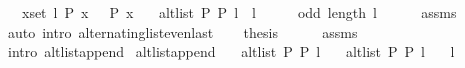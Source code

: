 \begin{isabellebody}
\ \ \ {\isachardoublequoteopen}{\isasymforall}x{\isasymin}set\ l{}{\isachardot}{\kern0pt}\ P{}\ x\ {\isasymlongleftrightarrow}\ {\isasymnot}\ P{}\ x{\isachardoublequoteclose}\isanewline
\ \ \ {\isachardoublequoteopen}alt{\isacharunderscore}{\kern0pt}list\ P{}\ P{}\ {\isacharparenleft}{\kern0pt}l{}\ {\isacharat}{\kern0pt}\ l{}{\isacharparenright}{\kern0pt}{\isachardoublequoteclose}%
\endisataginvisible
{\isafoldinvisible}%
%
\isadeliminvisible
%
\endisadeliminvisible
\isanewline
%
\isadelimproof
%
\endisadelimproof
%
\isatagproof
{}\isamarkupfalse%
\ {\isacharminus}{\kern0pt}\isanewline
\ \ \isamarkupfalse%
\ {\isachardoublequoteopen}odd\ {\isacharparenleft}{\kern0pt}length\ l{}{\isacharparenright}{\kern0pt}{\isachardoublequoteclose}\isanewline
\ \ \ \ \isamarkupfalse%
\ assms\isanewline
\ \ \ \ \isamarkupfalse%
\ {\isacharparenleft}{\kern0pt}auto\ intro{\isacharcolon}{\kern0pt}\ alternating{\isacharunderscore}{\kern0pt}list{\isacharunderscore}{\kern0pt}even{\isacharunderscore}{\kern0pt}last{\isacharparenright}{\kern0pt}\isanewline
\ \ \isamarkupfalse%
\ {\isacharquery}{\kern0pt}thesis\isanewline
\ \ \ \ \isamarkupfalse%
\ assms{\isacharparenleft}{\kern0pt}{}{\isacharcomma}{\kern0pt}\ {}{\isacharparenright}{\kern0pt}\isanewline
\ \ \ \ \isamarkupfalse%
\ {\isacharparenleft}{\kern0pt}intro\ alt{\isacharunderscore}{\kern0pt}list{\isacharunderscore}{\kern0pt}append{\isacharunderscore}{\kern0pt}{}{\isacharparenright}{\kern0pt}\isanewline
{}\isamarkupfalse%
%
\endisatagproof
{\isafoldproof}%
%
\isadelimproof
%
\endisadelimproof
\isanewline
%
\isadeliminvisible
\isanewline
%
\endisadeliminvisible
%
\isataginvisible
{}\isamarkupfalse%
\ alt{\isacharunderscore}{\kern0pt}list{\isacharunderscore}{\kern0pt}append{\isacharunderscore}{\kern0pt}{}{\isacharprime}{\kern0pt}{\isacharcolon}{\kern0pt}\isanewline
\ \ \ {\isachardoublequoteopen}alt{\isacharunderscore}{\kern0pt}list\ P{}\ P{}\ l{}{\isachardoublequoteclose}\isanewline
\ \ \ {\isachardoublequoteopen}alt{\isacharunderscore}{\kern0pt}list\ P{}\ P{}\ l{}{\isachardoublequoteclose}\isanewline
\ \ \ {\isachardoublequoteopen}l{}\ {\isasymnoteq}\ {\isacharbrackleft}{\kern0pt}{\isacharbrackright}{\kern0pt}{\isachardoublequoteclose}\isanewline

\end{isabellebody}
